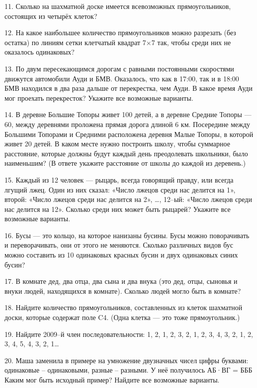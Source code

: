 11. Сколько на шахматной доске имеется всевозможных прямоугольников, состоящих из четырёх клеток?

12. На какое наибольшее количество прямоугольников можно разрезать (без остатка) по линиям сетки клетчатый квадрат 7×7 так, чтобы среди них не оказалось одинаковых?

13. По двум пересекающимся дорогам с равными постоянными скоростями движутся автомобили Ауди и БМВ. Оказалось, что как в 17:00, так и в 18:00 БМВ находился в два раза дальше от перекрестка, чем Ауди. В какое время Ауди мог проехать перекресток? Укажите все возможные варианты.

14. В деревне Большие Топоры живет 100 детей, а в деревне Средние Топоры — 60, между деревнями проложена прямая дорога длиной 6 км. Посередине между Большими Топорами и Средними расположена деревня Малые Топоры, в которой живет 20 детей. В каком месте нужно построить школу, чтобы суммарное расстояние, которые должны будут каждый день преодолевать школьники, было наименьшим? (В ответе укажите расстояние от школы до каждой из деревень.)

15. Каждый из 12 человек — рыцарь, всегда говорящий правду, или всегда лгущий лжец. Один из них сказал: «Число лжецов среди нас делится на 1», второй: «Число лжецов среди нас делится на 2», …, 12–ый: «Число лжецов среди нас делится на 12». Сколько среди них может быть рыцарей? Укажите все возможные варианты.

16. Бусы — это кольцо, на которое нанизаны бусины. Бусы можно поворачивать и переворачивать, они от этого не меняются. Сколько различных видов бус можно составить из 10 одинаковых красных бусин и двух одинаковых синих бусин?

17. В комнате дед, два отца, два сына и два внука (это дед, отцы, сыновья и внуки людей, находящихся в комнате). Сколько людей могло быть в комнате?

18. Найдите количество прямоугольников, составленных из клеток шахматной доски, которые содержат поле C4. (Одна клетка — это тоже прямоугольник.)

19. Найдите 2009–й член последовательности: 1, 2, 1, 2, 3, 2, 1, 2, 3, 4, 3, 2, 1, 2, 3, 4, 5, 4, 3, 2, 1…
  
20. Маша заменила в примере на умножение двузначных чисел цифры буквами: одинаковые – одинаковыми, разные – разными. У неё получилось АБ·ВГ = БББ Каким мог быть исходный пример? Найдите все возможные варианты.